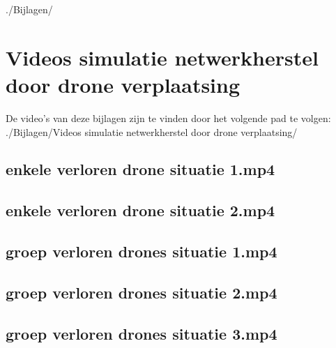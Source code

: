 \documentclass[a4paper, 11pt, oneside]{report}
\begin{document}
./Bijlagen/

\chapter{Videos simulatie netwerkherstel door drone verplaatsing}\label{sec:videos-simulatie-netwerkherstel-door-drone-verplaatsing}
De video's van deze bijlagen zijn te vinden door het volgende pad te volgen: \newline
./Bijlagen/Videos simulatie netwerkherstel door drone verplaatsing/
\section{enkele verloren drone situatie 1.mp4}\label{sec:enkele-verloren-drone-situatie-1mp4}
\section{enkele verloren drone situatie 2.mp4}\label{sec:enkele-verloren-drone-situatie-2mp4}
\section{groep verloren drones situatie 1.mp4}\label{sec:groep-verloren-drones-situatie-1mp4}
\section{groep verloren drones situatie 2.mp4}\label{sec:groep-verloren-drones-situatie-2mp4}
\section{groep verloren drones situatie 3.mp4}\label{sec:groep-verloren-drones-situatie-3mp4}
\end{document}
